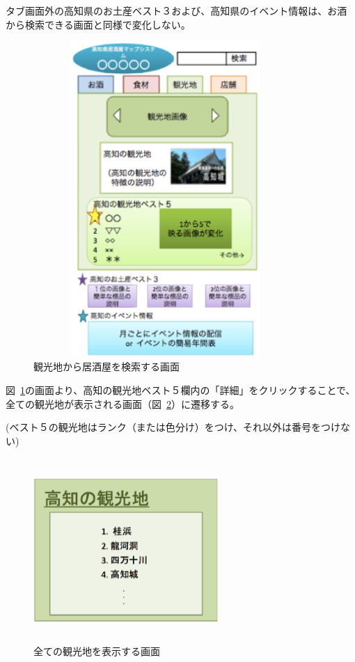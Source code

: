 タブ画面外の高知県のお土産ベスト３および、高知県のイベント情報は、お酒から検索できる画面と同様で変化しない。
\clearpage
\begin {figure}[!htbp]
    \begin{center}
    \includegraphics [height=12cm, width=10cm]{12.eps}
    \caption {観光地から居酒屋を検索する画面}
    \label {fig:12}
    \end{center}
\end {figure}

図~\ref{fig:12}の画面より、高知の観光地ベスト５欄内の「詳細」をクリックすることで、全ての観光地が表示される画面（図~\ref{fig:13}）に遷移する。

(ベスト５の観光地はランク（または色分け）をつけ、それ以外は番号をつけない)
\clearpage
\begin {figure}[!htbp]
    \begin{center}
    \includegraphics [height=7cm, width=7cm]{13.eps}
    \caption {全ての観光地を表示する画面}
    \label {fig:13}
    \end{center}
\end {figure}



